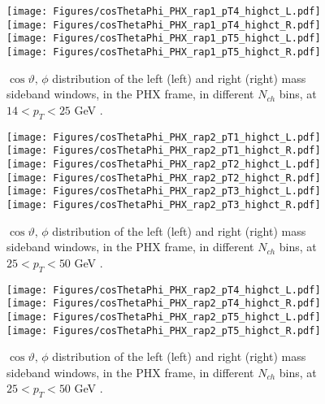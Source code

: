 \documentclass[12pt]{article}
\begin{document}
\begin{figure}[htbp]
\centering
\texttt{[image: Figures/cosThetaPhi\_PHX\_rap1\_pT4\_highct\_L.pdf]}
\texttt{[image: Figures/cosThetaPhi\_PHX\_rap1\_pT4\_highct\_R.pdf]}
\texttt{[image: Figures/cosThetaPhi\_PHX\_rap1\_pT5\_highct\_L.pdf]}
\texttt{[image: Figures/cosThetaPhi\_PHX\_rap1\_pT5\_highct\_R.pdf]}
\caption{$\cos\vartheta,\,\phi$ distribution of the left (left) and
  right (right) mass sideband windows, in the PHX frame, in different
  $N_{ch}$ bins, at $14 < p_{T} < 25$ GeV .}
\end{figure}
\clearpage


\begin{figure}[htbp]
\centering
\texttt{[image: Figures/cosThetaPhi\_PHX\_rap2\_pT1\_highct\_L.pdf]}
\texttt{[image: Figures/cosThetaPhi\_PHX\_rap2\_pT1\_highct\_R.pdf]}
\texttt{[image: Figures/cosThetaPhi\_PHX\_rap2\_pT2\_highct\_L.pdf]}
\texttt{[image: Figures/cosThetaPhi\_PHX\_rap2\_pT2\_highct\_R.pdf]}
\texttt{[image: Figures/cosThetaPhi\_PHX\_rap2\_pT3\_highct\_L.pdf]}
\texttt{[image: Figures/cosThetaPhi\_PHX\_rap2\_pT3\_highct\_R.pdf]}
\caption{$\cos\vartheta,\,\phi$ distribution of the left (left) and
  right (right) mass sideband windows, in the PHX frame, in different
  $N_{ch}$ bins, at $25 < p_{T} < 50$ GeV .}
\end{figure}
\clearpage

\begin{figure}[htbp]
\centering
\texttt{[image: Figures/cosThetaPhi\_PHX\_rap2\_pT4\_highct\_L.pdf]}
\texttt{[image: Figures/cosThetaPhi\_PHX\_rap2\_pT4\_highct\_R.pdf]}
\texttt{[image: Figures/cosThetaPhi\_PHX\_rap2\_pT5\_highct\_L.pdf]}
\texttt{[image: Figures/cosThetaPhi\_PHX\_rap2\_pT5\_highct\_R.pdf]}
\caption{$\cos\vartheta,\,\phi$ distribution of the left (left) and
  right (right) mass sideband windows, in the PHX frame, in different
  $N_{ch}$ bins, at $25 < p_{T} < 50$ GeV .}
\end{figure}
\clearpage
\end{document}

